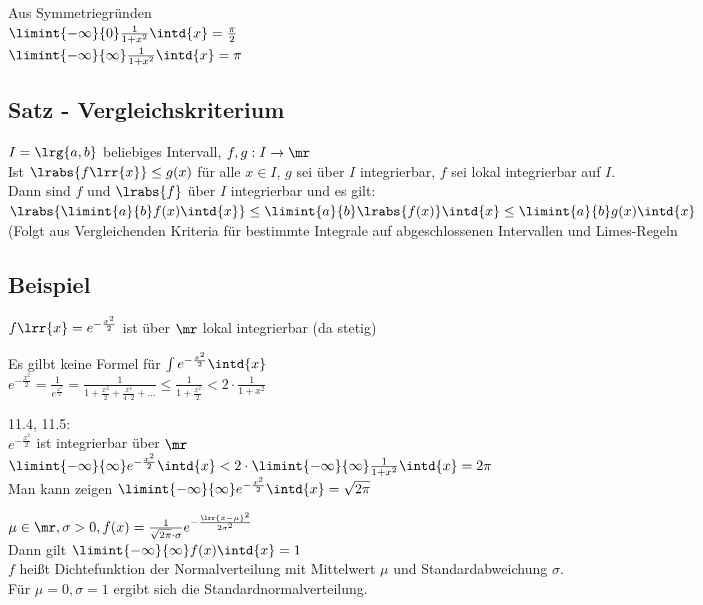 	Aus Symmetriegründen\\
	$\limint{-\infty}{0}\frac{1}{1+x^2}\intd{x}=\frac{\pi}{2}$\\
	$\limint{-\infty}{\infty}\frac{1}{1+x^2}\intd{x}=\pi$
	
\subsection{Satz - Vergleichskriterium}
	$I=\lrg{a,b}$ beliebiges Intervall, $f,g: I\rightarrow\mr$\\
	Ist $\lrabs{f\lrr{x}}\leq g(x)$ für alle $x\in I$, $g$ sei über $I$ integrierbar, $f$ sei lokal integrierbar auf $I$.\\
	Dann sind $f$ und $\lrabs{f}$ über $I$ integrierbar und es gilt:\\
	$\lrabs{\limint{a}{b}f(x)\intd{x}}\leq\limint{a}{b}\lrabs{f(x)}\intd{x}\leq\limint{a}{b}g(x)\intd{x}$\\
	(Folgt aus Vergleichenden Kriteria für bestimmte Integrale auf abgeschlossenen Intervallen und Limes-Regeln
	
\subsection{Beispiel}
		\item $f\lrr{x}=e^{-\frac{x^2}{2}}$ ist über $\mr$ lokal integrierbar (da stetig)\\
			
			Es gilbt keine Formel für $\int e^{-\frac{x^2}{2}}\intd{x}$\\
			$e^{-\frac{x^2}{2}}=\frac{1}{e^{\frac{x^2}{2}}}=\frac{1}{1+\frac{x^2}{2}+\frac{x^4}{4\cdot 2}+\dots}\leq\frac{1}{1+\frac{x^2}{2}}< 2\cdot\frac{1}{1+x^2}$
			
			11.4, 11.5:\\
			$e^{-\frac{x^2}{2}}$ ist integrierbar über $\mr$\\
			$\limint{-\infty}{\infty}e^{-\frac{x^2}{2}}\intd{x}<2\cdot\limint{-\infty}{\infty}\frac{1}{1+x^2}\intd{x}=2\pi$\\
			Man kann zeigen $\limint{-\infty}{\infty}e^{-\frac{x^2}{2}}\intd{x}=\sqrt{2\pi}$
		\item $\mu\in\mr, \sigma>0, f(x)=\frac{1}{\sqrt{2\pi}\cdot\sigma}e^{-\frac{\lrr{x-\mu}^2}{2\sigma^2}}$\\
			Dann gilt $\limint{-\infty}{\infty}f(x)\intd{x}=1$\\
			$f$ heißt Dichtefunktion der Normalverteilung mit Mittelwert $\mu$ und Standardabweichung $\sigma$.\\
			Für $\mu=0, \sigma=1$ ergibt sich die Standardnormalverteilung.
	\subExEnd